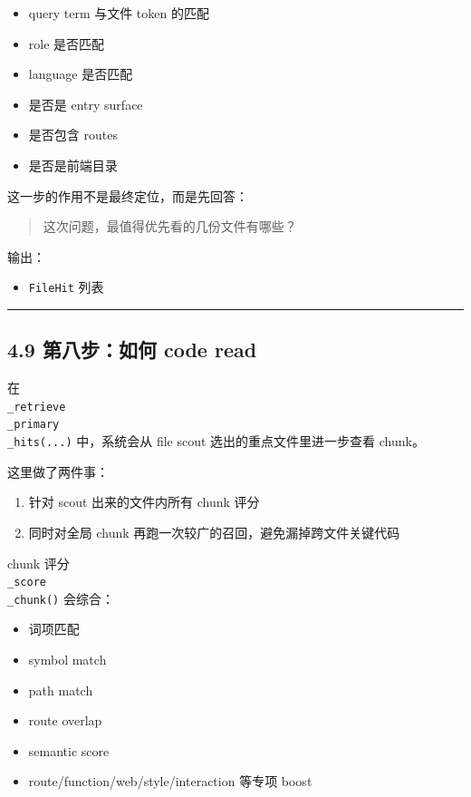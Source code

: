 \documentclass[UTF8,12pt,openany]{ctexbook}
\begin{document}
\begin{itemize}
\item query term 与文件 token 的匹配
\item role 是否匹配
\item language 是否匹配
\item 是否是 entry surface
\item 是否包含 routes
\item 是否是前端目录
\end{itemize}

这一步的作用不是最终定位，而是先回答：\par

\begin{quote}
这次问题，最值得优先看的几份文件有哪些？
\end{quote}

输出：\par

\begin{itemize}
\item \texttt{FileHit} 列表
\end{itemize}

\hrule

\subsection{4.9 第八步：如何 code read}

在 \texttt{\\_retrieve\\_primary\\_hits(...)} 中，系统会从 file scout 选出的重点文件里进一步查看 chunk。\par

这里做了两件事：\par

\begin{enumerate}
\item 针对 scout 出来的文件内所有 chunk 评分
\item 同时对全局 chunk 再跑一次较广的召回，避免漏掉跨文件关键代码
\end{enumerate}

chunk 评分 \texttt{\\_score\\_chunk()} 会综合：\par

\begin{itemize}
\item 词项匹配
\item symbol match
\item path match
\item route overlap
\item semantic score
\item route/function/web/style/interaction 等专项 boost
\end{itemize}
\end{document}
